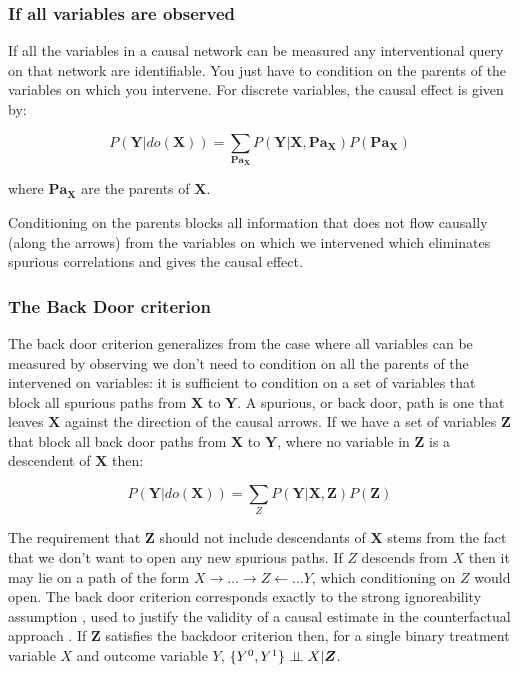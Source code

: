 \documentclass[11pt,a4paper]{article}
\begin{document}
\subsubsection{If all variables are observed}
If all the variables in a causal network can be measured any interventional query on that network are identifiable. You just have to condition on the parents of the variables on which you intervene. For discrete variables, the causal effect is given by:

\begin{equation}
P(\boldsymbol{Y}|do(\boldsymbol{X})) = \sum_{\boldsymbol{Pa_{X}}}{P(\boldsymbol{Y}|\boldsymbol{X},\boldsymbol{Pa_{X}})P(\boldsymbol{Pa_{X}})}
\end{equation}

where $\boldsymbol{Pa_{X}}$ are the parents of $\boldsymbol{X}$.


Conditioning on the parents blocks all information that does not flow causally (along the arrows) from the variables on which we intervened which eliminates spurious correlations and gives the causal effect. 

\subsubsection{The Back Door criterion}
The back door criterion generalizes from the case where all variables can be measured by observing we don't need to condition on all the parents of the intervened on variables: it is sufficient to condition on a set of variables that block all spurious paths from $\boldsymbol{X}$ to $\boldsymbol{Y}$. A spurious, or back door, path is one that leaves $\boldsymbol{X}$ against the direction of the causal arrows. If we have a set of variables $\boldsymbol{Z}$ that block all back door paths from $\boldsymbol{X}$ to $\boldsymbol{Y}$, where no variable in $\boldsymbol{Z}$ is a descendent of $\boldsymbol{X}$ then:

\begin{equation}
P(\boldsymbol{Y}|do(\boldsymbol{X})) = \sum_{Z}{P(\boldsymbol{Y}|\boldsymbol{X},\boldsymbol{Z})P(\boldsymbol{Z})}
\end{equation}

The requirement that $\boldsymbol{Z}$ should not include descendants of $\boldsymbol{X}$ stems from the fact that we don't want to open any new spurious paths. If $Z$ descends from $X$ then it may lie on a path of the form $X \rightarrow...\rightarrow Z \leftarrow... Y$, which conditioning on $Z$ would open. The back door criterion corresponds exactly to the strong ignoreability assumption \cite{Rosenbaum1983}, used to justify the validity of a causal estimate in the counterfactual approach . If $\boldsymbol{Z}$ satisfies the backdoor criterion then, for a single binary treatment variable $X$ and outcome variable $Y$, $\{Y^{0},Y^{1}\} \perp\!\!\!\perp X | \boldsymbol{Z}$. 
 
\end{document}
